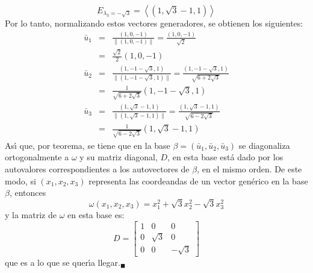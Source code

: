 \begin{solucion}
 \begin{equation*}
  E_{\lambda_3 = -\sqrt{3}} = \left< (1,\sqrt{3}-1,1) \right>
 \end{equation*}
 Por lo tanto, normalizando estos vectores generadores, se obtienen los siguientes: 
 \begin{eqnarray*}
  \bar{u}_1 & = & \frac{(1,0,-1)}{\lVert (1,0,-1) \rVert} = \frac{(1,0,-1)}{\sqrt{2}} \\
  & = & \frac{\sqrt{2}}{2}(1,0,-1) \\
  \bar{u}_2 & = & \frac{(1,-1-\sqrt{3},1)}{\lVert (1,-1-\sqrt{3},1) \rVert} = \frac{(1,-1-\sqrt{3},1)}{\sqrt{6 + 2\sqrt{3}}} \\
  & = & \frac{1}{\sqrt{6 + 2\sqrt{3}}}(1,-1-\sqrt{3},1) \\
  \bar{u}_3 & = & \frac{(1,\sqrt{3}-1,1)}{\lVert (1,\sqrt{3}-1,1) \rVert} = \frac{(1,\sqrt{3}-1,1)}{\sqrt{6 - 2\sqrt{3}}} \\
  & = & \frac{1}{\sqrt{6 - 2\sqrt{3}}}(1,\sqrt{3}-1,1)
 \end{eqnarray*}
 As\'{\i} que, por teorema, se tiene que en la base $\beta = \left( \bar{u}_1, \bar{u}_2, \bar{u}_3 \right)$ se diagonaliza ortogonalmente a $\omega$ y su matriz diagonal, $D$, en esta base est\'a dado por los autovalores correspondientes a los autovectores de $\beta$, en el mismo orden. De este modo, si $(x_1, x_2, x_3)$ representa las coordeandas de un vector gen\'erico en la base $\beta$, entonces
 \begin{equation*}
  \omega(x_1, x_2, x_3) = x_1^2 + \sqrt{3}x_2^2 - \sqrt{3}x_3^2
 \end{equation*}
 y la matriz de $\omega$ en esta base es:
 \begin{equation*}
  D = 
  \begin{bmatrix}
   1 & 0 & 0 \\
   0 & \sqrt{3} & 0 \\
   0 & 0 & -\sqrt{3}
  \end{bmatrix}
 \end{equation*}
 que es a lo que se quer\'{\i}a llegar.${}_{\blacksquare}$
\end{solucion}
